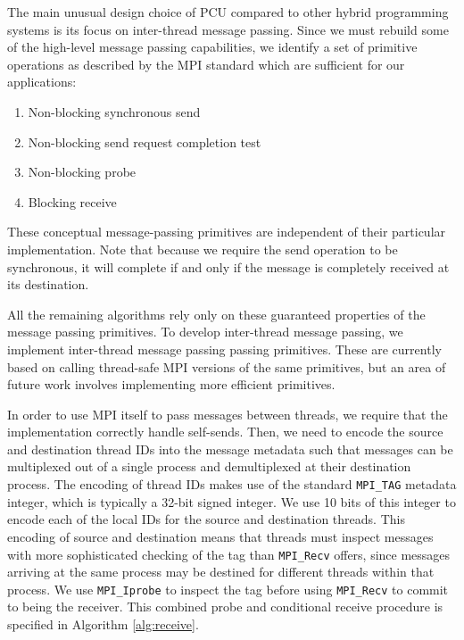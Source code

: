 The main unusual design choice of PCU compared to
other hybrid programming systems is
its focus on inter-thread message passing.
Since we must rebuild some of the high-level message
passing capabilities, we identify a set of primitive
operations as described by the MPI standard \cite{walker1996mpi}
which are sufficient for our applications:

\begin{enumerate}
\item Non-blocking synchronous send
\item Non-blocking send request completion test
\item Non-blocking probe
\item Blocking receive
\end{enumerate}

These conceptual message-passing primitives are independent
of their particular implementation.
Note that because we require the send operation to be synchronous,
it will complete if and only if the message is completely received at its
destination.

All the remaining algorithms rely only on these guaranteed properties
of the message passing primitives.
To develop inter-thread message passing, we implement inter-thread
message passing passing primitives.
These are currently based on calling thread-safe MPI versions of the
same primitives, but an area of future work involves implementing
more efficient primitives.

In order to use MPI itself to pass messages between threads, we require
that the implementation correctly handle self-sends.
Then, we need to encode the source and destination thread IDs into the message
metadata such that messages can be multiplexed out of a single process
and demultiplexed at their destination process.
The encoding of thread IDs makes use of the standard \texttt{MPI\_TAG} metadata
integer, which is typically a 32-bit signed integer.
We use 10 bits of this integer to encode each of the local IDs for the
source and destination threads.
This encoding of source and destination means that threads must inspect
messages with more sophisticated checking of the tag than
\texttt{MPI\_Recv}
offers, since messages arriving at the same process may be destined
for different threads within that process.
We use \texttt{MPI\_Iprobe} to inspect the tag before using
\texttt{MPI\_Recv} to commit to being the receiver.
This combined probe and conditional receive procedure is specified
in Algorithm \ref{alg:receive}.

